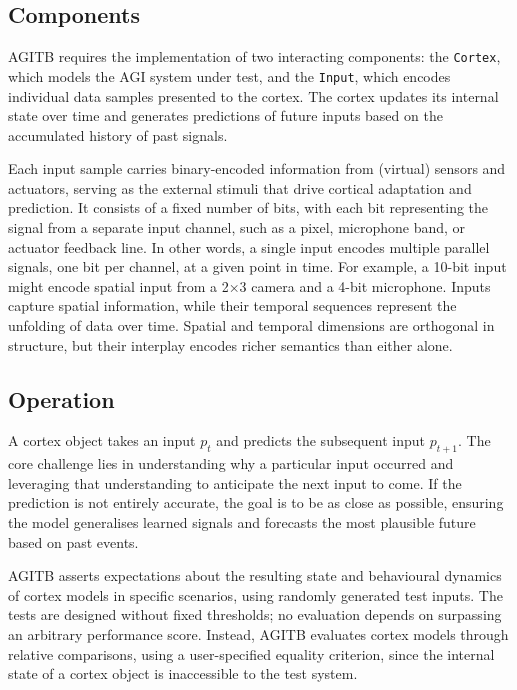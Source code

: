 \documentclass{article}
\begin{document}
\subsection{Components}

AGITB requires the implementation of two interacting components: the \texttt{Cortex}, which models the AGI system under test, and the \texttt{Input}, which encodes individual data samples presented to the cortex. The cortex updates its internal state over time and generates predictions of future inputs based on the accumulated history of past signals.

Each input sample carries binary-encoded information from (virtual) sensors and actuators, serving as the external stimuli that drive cortical adaptation and prediction. It consists of a fixed number of bits, with each bit representing the signal from a separate input channel, such as a pixel, microphone band, or actuator feedback line. In other words, a single input encodes multiple parallel signals, one bit per channel, at a given point in time. For example, a 10-bit input might encode spatial input from a 2×3 camera and a 4-bit microphone. Inputs capture spatial information, while their temporal sequences represent the unfolding of data over time. Spatial and temporal dimensions are orthogonal in structure, but their interplay encodes richer semantics than either alone. 


\subsection{Operation}

A cortex object takes an input $p_t$ and predicts the subsequent input $p_{t+1}$. The core challenge lies in understanding why a particular input occurred and leveraging that understanding to anticipate the next input to come. If the prediction is not entirely accurate, the goal is to be as close as possible, ensuring the model generalises learned signals and forecasts the most plausible future based on past events.

AGITB asserts expectations about the resulting state and behavioural dynamics of cortex models in specific scenarios, using randomly generated test inputs. The tests are designed without fixed thresholds; no evaluation depends on surpassing an arbitrary performance score. Instead, AGITB evaluates cortex models through relative comparisons, using a user-specified equality criterion, since the internal state of a cortex object is inaccessible to the test system.
\end{document}
